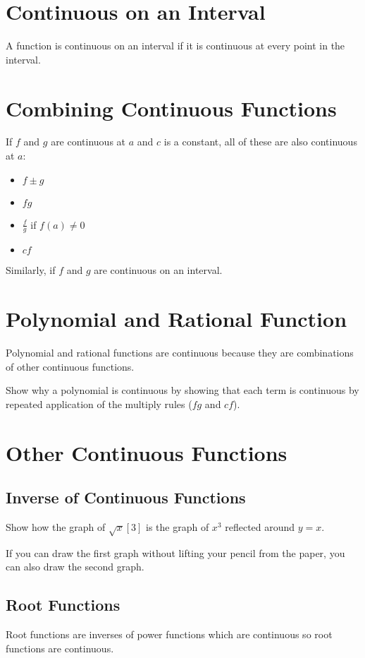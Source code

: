 \documentclass[letterpaper, landscape]{exam}
\begin{document}
  \section{Continuous on an Interval}
  A function is continuous on an interval if it is continuous at every point in the
  interval.

  \section{Combining Continuous Functions}
  If $f$ and $g$ are continuous at $a$ and $c$ is a constant, all of these are also
  continuous at $a$:

  \begin{itemize}
    \item $f \pm g$
    \item $fg$
    \item $\frac{f}{g}$ if $f(a) \neq 0$
    \item $cf$
  \end{itemize}

  Similarly, if $f$ and $g$ are continuous on an interval.

  \section{Polynomial and Rational Function}
  Polynomial and rational functions are continuous because they are combinations of other
  continuous functions.

  Show why a polynomial is continuous by showing that each term is continuous by repeated
  application of the multiply rules ($fg$ and $cf$).

  \section{Other Continuous Functions}
  \subsection{Inverse of Continuous Functions}

  Show how the graph of $\sqrt{x}[3]$ is the graph of $x^3$ reflected around $y = x$.

  If you can draw the first graph without lifting your pencil from the paper, you can also
  draw the second graph.

  \subsection{Root Functions}
  Root functions are inverses of power functions which are continuous so root functions
  are continuous.
\end{document}
